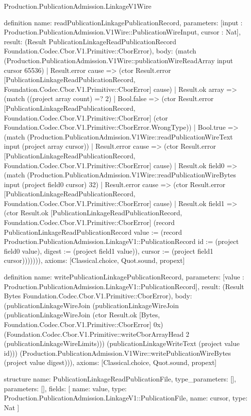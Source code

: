 \begin{lexlean}{Production.PublicationAdmission.LinkageV1Wire}
\begin{semanticmodule}
definition{
  name: readPublicationLinkagePublicationRecord,
  parameters: [input : Production.PublicationAdmission.V1Wire::PublicationWireInput, cursor : Nat],
  result: (Result PublicationLinkageReadPublicationRecord Foundation.Codec.Cbor.V1.Primitive::CborError),
  body: (match (Production.PublicationAdmission.V1Wire::publicationWireReadArray input cursor 65536)
    | Result.error cause => (ctor Result.error [PublicationLinkageReadPublicationRecord, Foundation.Codec.Cbor.V1.Primitive::CborError] cause)
    | Result.ok array => (match ((project array count) =? 2)
      | Bool.false => (ctor Result.error [PublicationLinkageReadPublicationRecord, Foundation.Codec.Cbor.V1.Primitive::CborError] (ctor Foundation.Codec.Cbor.V1.Primitive::CborError.WrongType))
      | Bool.true => (match (Production.PublicationAdmission.V1Wire::readPublicationWireText input (project array cursor))
        | Result.error cause => (ctor Result.error [PublicationLinkageReadPublicationRecord, Foundation.Codec.Cbor.V1.Primitive::CborError] cause)
        | Result.ok field0 => (match (Production.PublicationAdmission.V1Wire::readPublicationWireBytes input (project field0 cursor) 32)
          | Result.error cause => (ctor Result.error [PublicationLinkageReadPublicationRecord, Foundation.Codec.Cbor.V1.Primitive::CborError] cause)
          | Result.ok field1 => (ctor Result.ok [PublicationLinkageReadPublicationRecord, Foundation.Codec.Cbor.V1.Primitive::CborError] (record PublicationLinkageReadPublicationRecord {value := (record Production.PublicationAdmission.LinkageV1::PublicationRecord {id := (project field0 value), digest := (project field1 value)}), cursor := (project field1 cursor)})))))),
  axioms: [Classical.choice, Quot.sound, propext]
}

definition{
  name: writePublicationLinkagePublicationRecord,
  parameters: [value : Production.PublicationAdmission.LinkageV1::PublicationRecord],
  result: (Result Bytes Foundation.Codec.Cbor.V1.Primitive::CborError),
  body: (publicationLinkageWireJoin (publicationLinkageWireJoin (publicationLinkageWireJoin (ctor Result.ok [Bytes, Foundation.Codec.Cbor.V1.Primitive::CborError] 0x) (Foundation.Codec.Cbor.V1.Primitive::writeCborArrayHead 2 (publicationLinkageWireLimits))) (publicationLinkageWriteText (project value id))) (Production.PublicationAdmission.V1Wire::writePublicationWireBytes (project value digest))),
  axioms: [Classical.choice, Quot.sound, propext]
}

structure{
  name: PublicationLinkageReadPublicationFile,
  type_parameters: [],
  parameters: [],
  fields: [
    {name: value, type: Production.PublicationAdmission.LinkageV1::PublicationFile},
    {name: cursor, type: Nat}
  ]
}


\end{semanticmodule}
\end{lexlean}
